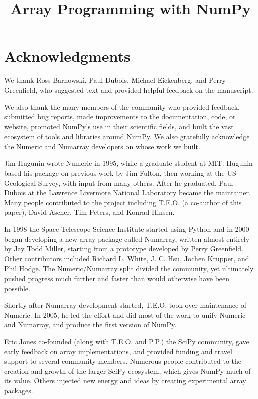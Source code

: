 \documentclass[twocolumn]{wlscirep}
\title{Array Programming with NumPy}
\begin{document}
\flushbottom
\maketitle
\thispagestyle{empty}

%





\section*{Acknowledgments}

We thank Ross Barnowski, Paul Dubois, Michael Eickenberg, and Perry Greenfield, who
suggested text and provided helpful feedback on the manuscript.

We also thank the many members of the community who provided
feedback, submitted bug reports, made improvements to the documentation,
code, or website, promoted NumPy's use in their scientific fields, and built
the vast ecosystem of tools and libraries around NumPy.
We also gratefully acknowledge the Numeric and Numarray developers
on whose work we built.  

Jim Hugunin wrote Numeric in 1995, while a graduate student at MIT.
Hugunin based his package on previous work by Jim Fulton, then working at the
US Geological Survey, with input from many others.
After he graduated, Paul Dubois at the Lawrence Livermore National Laboratory
became the maintainer.
Many people contributed to the project including T.E.O. (a co-author
of this paper), David Ascher, Tim Peters, and Konrad Hinsen.

In 1998 the Space Telescope Science Institute started using Python
and in 2000 began developing a new array package called Numarray, written
almost entirely by Jay Todd Miller, starting from a prototype developed by
Perry Greenfield.  Other contributors included Richard L. White, J. C. Hsu,
Jochen Krupper, and Phil Hodge.
The Numeric/Numarray split divided the community, yet ultimately pushed
progress much further and faster than would otherwise have been possible. 

Shortly after Numarray development started, T.E.O. took over maintenance of
Numeric. In 2005, he led the effort and did most of the work to unify Numeric
and Numarray, and produce the first version of NumPy.

Eric Jones co-founded (along with T.E.O. and P.P.) the SciPy community, gave early feedback on array
implementations, and provided funding and travel support to several
community members.
Numerous people contributed to the creation and
growth of the larger SciPy ecosystem, which gives NumPy much of its
value. Others injected new energy and ideas by creating experimental
array packages.
\end{document}
